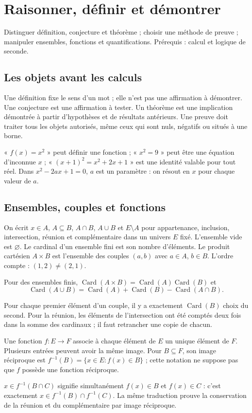 \documentclass[../cours_1re.tex]{subfiles}
\begin{document}
\setcounter{chapter}{0}
\chapter{Raisonner, définir et démontrer}
\label{ch:01}
\begin{objectif}
Distinguer définition, conjecture et théorème ; choisir une méthode de preuve ; manipuler ensembles, fonctions et quantifications. Prérequis : calcul et logique de seconde.
\end{objectif}
\section{Les objets avant les calculs}
Une définition fixe le sens d'un mot ; elle n'est pas une affirmation à démontrer. Une conjecture est une affirmation à tester. Un théorème est une implication démontrée à partir d'hypothèses et de résultats antérieurs. Une preuve doit traiter tous les objets autorisés, même ceux qui sont nuls, négatifs ou situés à une borne.
\begin{exemple}
« $f(x)=x^2$ » peut définir une fonction ; « $x^2=9$ » peut être une équation d'inconnue $x$ ; « $(x+1)^2=x^2+2x+1$ » est une identité valable pour tout réel. Dans $x^2-2ax+1=0$, $a$ est un paramètre : on résout en $x$ pour chaque valeur de $a$.
\end{exemple}
\section{Ensembles, couples et fonctions}
On écrit $x\in A$, $A\subseteq B$, $A\cap B$, $A\cup B$ et $E\setminus A$ pour appartenance, inclusion, intersection, réunion et complémentaire dans un univers $E$ fixé. L'ensemble vide est $\varnothing$. Le cardinal d'un ensemble fini est son nombre d'éléments.
Le produit cartésien $A\times B$ est l'ensemble des couples $(a,b)$ avec $a\in A$, $b\in B$. L'ordre compte : $(1,2)\ne(2,1)$.
\begin{propriete}
Pour des ensembles finis, $\operatorname{Card}(A\times B)=\operatorname{Card}(A)\operatorname{Card}(B)$ et
\[
\operatorname{Card}(A\cup B)=\operatorname{Card}(A)+\operatorname{Card}(B)-\operatorname{Card}(A\cap B).
\]
\end{propriete}
\begin{demonstration}
Pour chaque premier élément d'un couple, il y a exactement $\operatorname{Card}(B)$ choix du second. Pour la réunion, les éléments de l'intersection ont été comptés deux fois dans la somme des cardinaux ; il faut retrancher une copie de chacun.
\end{demonstration}
Une fonction $f:E\to F$ associe à chaque élément de $E$ un unique élément de $F$. Plusieurs entrées peuvent avoir la même image. Pour $B\subseteq F$, son image réciproque est $f^{-1}(B)=\{x\in E:f(x)\in B\}$ ; cette notation ne suppose pas que $f$ possède une fonction réciproque.
\begin{demonstration}
$x\in f^{-1}(B\cap C)$ signifie simultanément $f(x)\in B$ et $f(x)\in C$ : c'est exactement $x\in f^{-1}(B)\cap f^{-1}(C)$. La même traduction prouve la conservation de la réunion et du complémentaire par image réciproque.
\end{demonstration}
\end{document}
